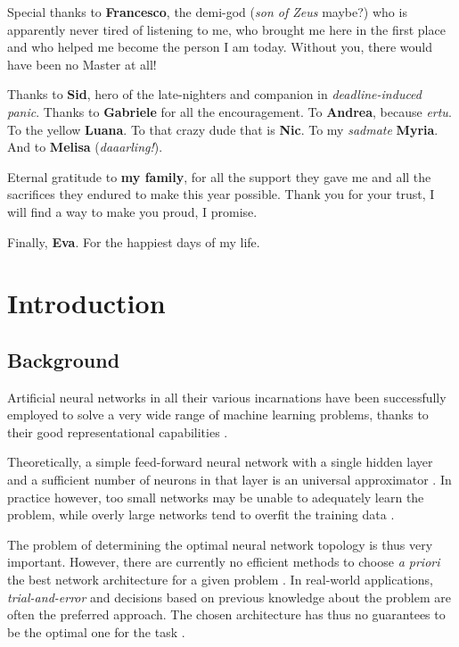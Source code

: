 \documentclass[11pt,a4paper]{report}
\begin{document}
		Special thanks to \textbf{Francesco}, the demi-god (\emph{son of Zeus} maybe?) who is apparently never tired of listening to me, who brought me here in the first place and who helped me become the person I am today. Without you, there would have been no Master at all!
		
		Thanks to \textbf{Sid}, hero of the late-nighters and companion in \emph{deadline-induced panic}. Thanks to \textbf{Gabriele} for all the encouragement. To \textbf{Andrea}, because \emph{ertu}. To the yellow \textbf{Luana}. To that crazy dude that is \textbf{Nic}. To my \emph{sadmate} \textbf{Myria}. And to \textbf{Melisa} (\emph{daaarling!}).
		
		Eternal gratitude to \textbf{my family}, for all the support they gave me and all the sacrifices they endured to make this year possible. Thank you for your trust, I will find a way to make you proud, I promise.
		
		Finally, \textbf{Eva}. For the happiest days of my life.
	
	
	\renewcommand*\contentsname{Table of Contents}
	\tableofcontents

	\printnomenclature[0.7in]
	\listoffigures
	\listoftables
	
	
	\chapter{Introduction}
		\section{Background}
			\label{sec:background}
			Artificial neural networks in all their various incarnations have been successfully employed to solve a very wide range of machine learning problems, thanks to their good representational capabilities \cite{sharma2010constructive}.
		
		
			Theoretically, a simple feed-forward neural network with a single hidden layer and a sufficient number of neurons in that layer is an universal approximator \cite{hornik1989multilayer,kuurkova1992kolmogorov}. In practice however, too small networks may be unable to adequately learn the problem, while overly large networks tend to overfit the training data \cite{parekh2000constructive}.
		
			The problem of determining the optimal neural network topology is thus very important. However, there are currently no efficient methods to choose \emph{a priori} the best network architecture for a given problem \cite{parekh2000constructive}. In real-world applications, \emph{trial-and-error} and decisions based on previous knowledge about the problem are often the preferred approach. The chosen architecture has thus no guarantees to be the optimal one for the task \cite{sharma2010constructive}.
		
\end{document}
